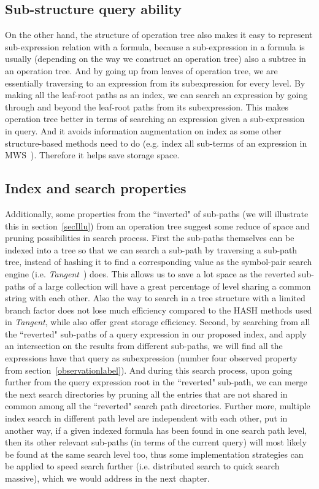\subsection{Sub-structure query ability}
On the other hand, the structure of operation tree also makes it easy to represent sub-expression relation with a formula, because a sub-expression in a formula is usually (depending on the way we construct an operation tree) also a subtree in an operation tree. 
And by going up from leaves of operation tree, we are essentially traversing to an expression from its subexpression for every level. 
By making all the leaf-root paths as an index, we can search an expression by going through and beyond the leaf-root paths from its subexpression. 
This makes operation tree better in terms of searching an expression given a sub-expression in query. 
And it avoids information augmentation on index as some other structure-based methods need to do (e.g. index all sub-terms of an expression in MWS~\cite{Kohlhase06}). Therefore it helps save storage space. 

\subsection{Index and search properties}
Additionally, some properties from the ``inverted" of sub-paths (we will illustrate this in section~\ref{secIllu}) from an operation tree suggest some reduce of space and pruning possibilities in search process. 
First the sub-paths themselves can be indexed into a tree so that we can search a sub-path by traversing a sub-path tree, instead of hashing it to find a corresponding value as the symbol-pair search engine (i.e. \textit{Tangent}~\cite{symbolpairs15}) does. 
This allows us to save a lot space as the reverted sub-paths of a large collection will have a great percentage of level sharing a common string with each other. 
Also the way to search in a tree structure with a limited branch factor does not lose much efficiency compared to the HASH methods used in \textit{Tangent}, while also offer great storage efficiency.
Second, by searching from all the ``reverted" sub-paths of a query expression in our proposed index, and apply an intersection on the results from different sub-paths, we will find all the expressions have that query as subexpression (number four observed property from section~\ref{observationlabel}). And during this search process, upon going further from the query expression root in the ``reverted" sub-path, we can merge the next search directories by pruning all the entries that are not shared in common among all the ``reverted" search path directories. 
Further more, multiple index search in different path level are independent with each other, put in another way, if a given indexed formula has been found in one search path level, then its other relevant sub-paths (in terms of the current query) will most likely be found at the same search level too, thus some implementation strategies can be applied to speed search further (i.e. distributed search to quick search massive), which we would address in the next chapter.

